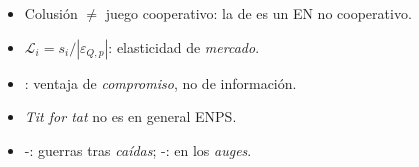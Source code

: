 \documentclass{article}
\begin{document}
\begin{columnas}
\begin{trampa}
\begin{itemize}
\item Colusión $\neq$ juego cooperativo: la de  es un EN no cooperativo.
\item $\mathcal{L}_i=s_i/|\varepsilon_{Q,p}|$: elasticidad de \emph{mercado}.
\item {}: ventaja de \emph{compromiso}, no de información.
\item \emph{Tit for tat} no es en general ENPS.
\item {}-: guerras tras \emph{caídas}; -: en los \emph{auges}.
\end{itemize}
\end{trampa}

\end{columnas}
\end{document}
